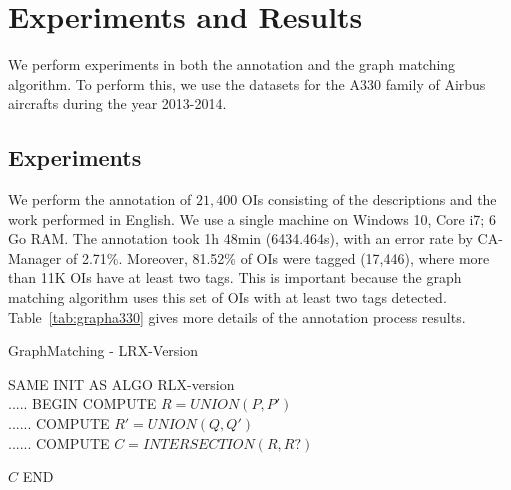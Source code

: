 \documentclass[a4paper,english,submission]{rnti}  %
\begin{document}
\section{Experiments and Results}
\label{sec:exp-results}

We perform experiments in both the annotation and the graph matching algorithm. To perform this, we use the datasets for the A330 family of Airbus aircrafts during the year 2013-2014.  

\subsection{Experiments}
We perform the annotation of $21,400$ OIs consisting of the descriptions and the work performed in English. We use a single machine on Windows 10, Core i7; 6 Go RAM. The annotation took 1h 48min (6434.464s), with an error rate by CA-Manager of 2.71\%. Moreover, 81.52\% of OIs were tagged (17,446), where more than 11K OIs have at least two tags. This is important because the graph matching algorithm uses this set of OIs with at least two tags detected. Table~\ref{tab:grapha330} gives more details of the annotation process results.  


\begin{algorithm}[!htb]\scriptsize
 \caption{GraphMatching - LRX-Version}
 \label{graphmatching2}
\begin{algorithmic}[1]
\STATE SAME INIT AS ALGO RLX-version \\
.....
\STATE BEGIN
 \STATE COMPUTE $R = UNION(P,P')$ \\
 ......
 \STATE COMPUTE $R' = UNION(Q,Q')$ \\
 ......
 \STATE COMPUTE $C = INTERSECTION(R, R?)$

\RETURN $C$
  \STATE END
\end{algorithmic}
\end{algorithm}
\end{document}
